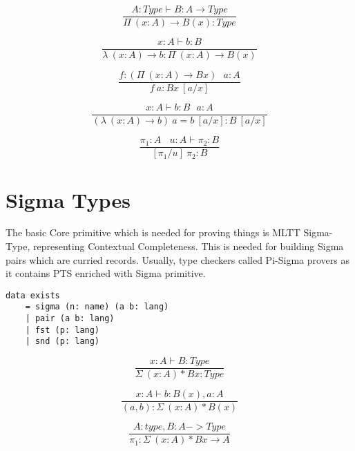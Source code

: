 \documentclass{aip-cp}
\begin{document}
\begin{equation}
\tag{$\Pi$-formation}
\dfrac
{A : Type \vdash B : A \rightarrow Type}
{\Pi\ (x:A) \rightarrow B(x) : Type}
\end{equation}

\begin{equation}
\tag{$\lambda$-intro}
\dfrac
{x:A \vdash b : B}
{\lambda\ (x:A) \rightarrow b : \Pi\ (x:A) \rightarrow B(x) }
\end{equation}

\begin{equation}
\tag{$App$-elimination}
\dfrac
{f: (\Pi\ (x:A) \rightarrow B x)\ \ \ a: A}
{f\ a : B x\ [a/x]}
\end{equation}

\begin{equation}
\tag{$\beta$-computation}
\dfrac
{x:A \vdash b: B\ \ \ a:A}
{(\lambda\ (x:A) \rightarrow b)\ a = b\ [a/x] : B\ [a/x]}
\end{equation}

\begin{equation}
\tag{subst}
\dfrac
{\pi_1 : A\ \ \ \ u:A \vdash \pi_2 : B}
{[\pi_1/u]\ \pi_2 : B}
\end{equation}

\section{Sigma Types}

The basic Core primitive which is needed for proving things
is MLTT Sigma-Type, representing Contextual Completeness.
This is needed for building Sigma pairs which are curried
records. Usually, type checkers called Pi-Sigma provers
as it contains PTS enriched with Sigma primitive.

\begin{lstlisting}[mathescape=true]
data exists
    = sigma (n: name) (a b: lang)
    | pair (a b: lang)
    | fst (p: lang)
    | snd (p: lang)
\end{lstlisting}

\begin{equation}
\tag{$\Sigma$-formation}
\dfrac
{x:A \vdash B : Type}
{\Sigma\ (x:A) * B x : Type}
\end{equation}

\begin{equation}
\tag{$\Sigma$-intro}
\dfrac
{x:A \vdash b : B(x), a: A}
{(a,b) : \Sigma\ (x:A) * B(x) }
\end{equation}

\begin{equation}
\tag{$\pi_1$-elimination}
\dfrac
{A: type, B: A -> Type}
{\pi_1 : \Sigma\ (x:A) * B x \rightarrow A}
\end{equation}
\end{document}
